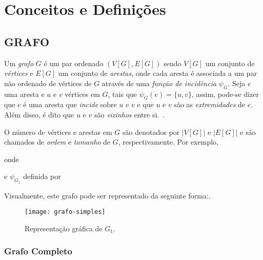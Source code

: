 \chapter{Conceitos e Defini{\c   c}{\~o}es}
\label{conceitos}

\section{\texorpdfstring{\MakeUppercase{Grafo}}{}}
\label{conceitos__grafo}

Um \emph{grafo} $G$ é um par ordenado $(V[G], E[G])$ sendo $V[G]$ um conjunto de \emph{vértices} e $E[G]$ um conjunto de \emph{arestas}, onde cada aresta é associada a um par não ordenado de vértices de $G$ através de uma \emph{função de incidência} $\psi_{G}$. Seja $e$ uma aresta e $u$ e $v$ vértices em $G$, tais que $\psi_{G}(e) = \{u, v\}$, assim, pode-se dizer que $e$ é uma aresta que \emph{incide} sobre $u$ e $v$ e que $u$ e $v$ são as \emph{extremidades} de $e$. Além disso, é dito que $u$ e $v$ são \emph{vizinhos} entre si.~\cite{bondy1976graph}.

O número de vértices e arestas em $G$ são denotados por $|V[G]|$ e $|E[G]|
$ e são chamados de \emph{ordem} e \emph{tamanho} de $G$, respectivamente. Por exemplo,


\noindent onde



\noindent e $\psi_{G_{1}}$ definida por



Visualmente, este grafo pode ser representado da seguinte forma:.

\begin{figure}[h]
\texttt{[image: grafo-simples]}
\centering
\caption{Representação gráfica de $G_{1}$.}
\label{fig:grafo-simples}
\end{figure}

\subsection{Grafo Completo}
\label{conceitos__grafo--comleto}

